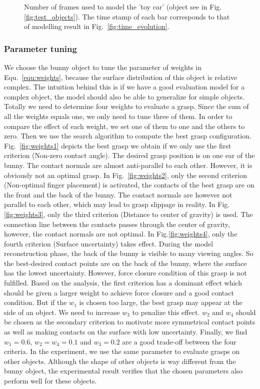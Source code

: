 \begin{figure}[!htbp]
\centering
\def\svgwidth{0.7\linewidth}

\caption{Number of frames used to model the 'toy car' (object see in Fig.~ \ref{fig:test_objects}). The time stamp of each bar corresponds to that of modelling result in Fig.~\ref{fig:time_evolution}.}
\label{fig:numberofframes}
\end{figure}

\subsubsection{Parameter tuning}
We choose the bunny object to tune the parameter of weights in Equ.~\ref{equ:weights}, because the surface distribution of this object is relative complex. The intuition behind this is if we have a good evaluation model for a complex object, the model should also be able to generalize for simple objects.  Totally we need to determine four weights to evaluate a grasp. Since the sum of all the weights equals one, we only need to tune three of them. In order to compare the effect of each weight, we set one of them to one and the others to zero. Then we use the search algorithm to compute the best grasp configuration. Fig.~\ref{fig:weights1} depicts the best grasp we obtain if we only use the first criterion (Non-zero contact angle). The desired grasp position is on one ear of the bunny. The contact normals are almost anti-parallel to each other. However, it is obviously not an optimal grasp. In Fig.~\ref{fig:weights2}, only the second criterion (Non-optimal finger placement) is activated, the contacts of the best grasp are on the front and the back of the bunny. The contact normals are however not parallel to each other, which may lead to grasp slippage in reality. In Fig.\ref{fig:weights3}, only the third criterion (Distance to center of gravity) is used. The connection line between the contacts passes through the center of gravity, however, the contact normals are not optimal. In Fig.\ref{fig:weights4}, only the fourth criterion (Surface uncertainty) takes effect. During the model reconstruction phase, the back of the bunny is visible to many viewing angles. So the best-desired contact points are on the back of the bunny, where the surface has the lowest uncertainty. However, force closure condition of this grasp is not fulfilled. Based on the analysis, the first criterion has a dominant effect which should be given a larger weight to achieve force closure and a good contact condition. But if the $w_1$ is chosen too large, the best grasp may appear at the side of an object. We need to increase $w_3$ to penalize this effect. $w_2$ and $w_4$ should be chosen as the secondary criterion to motivate more symmetrical contact points as well as making contacts on the surface with low uncertainty. Finally, we find $w_1= 0.6$, $w_2 = w_4 = 0.1$ and $w_3 = 0.2$ are a good trade-off between the four criteria. In the experiment, we use the same parameter to evaluate grasps on other objects. Although the shape of other objects is way different from the bunny object, the experimental result verifies that the chosen parameters also perform well for these objects.

